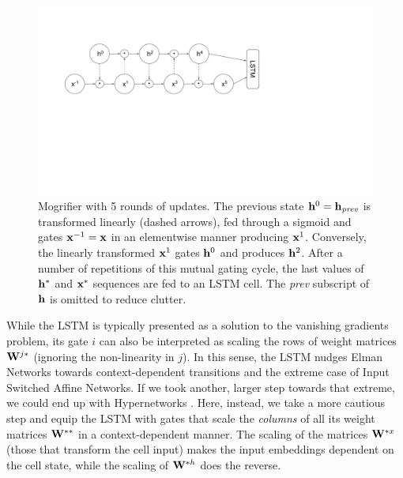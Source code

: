 \begin{figure}[!t]\centering
  \includegraphics[scale=0.7,trim={1.8cm 7.5cm 8.3cm 2.5cm},clip]
                  {mogrifier/figure/mogrifier.pdf}
  \caption[Mogrifier with 5 rounds of updates.]{Mogrifier with
    5 rounds of updates. The previous state $\mathbf{h}^0=\mathbf{h}_{\textit{prev}}$ is
    transformed linearly (dashed arrows), fed through a sigmoid and
    gates $\mathbf{x}^{-1}=\mathbf{x}$ in an elementwise manner producing $\mathbf{x}^1$.
    Conversely, the linearly transformed $\mathbf{x}^1$ gates $\mathbf{h}^0$ and
    produces $\mathbf{h}^2$. After a number of repetitions of this mutual
    gating cycle, the last values of $\mathbf{h}^*$ and $\mathbf{x}^*$ sequences are
    fed to an LSTM cell. The \emph{prev} subscript of $\mathbf{h}$ is omitted
    to reduce clutter.}
  \label{fig:mogrifier}
\end{figure}
%
While the LSTM is typically presented as a solution to the vanishing
gradients problem, its gate $i$ can also be interpreted as scaling the
rows of weight matrices $\mathbf{W}^{j*}$ (ignoring the non-linearity in
$j$).
%
In this sense, the LSTM nudges Elman Networks towards
context-dependent transitions and the extreme case of Input Switched
Affine Networks.
%
If we took another, larger step towards that extreme, we could end up
with Hypernetworks \citep{ha2016hypernetworks}.
%
Here, instead, we take a more cautious step and equip the LSTM with
gates that scale the \emph{columns} of all its weight matrices
$\mathbf{W}^{**}$ in a context-dependent manner.
%
The scaling of the matrices $\mathbf{W}^{*x}$ (those that transform the cell
input) makes the input embeddings dependent on the cell state, while
the scaling of $\mathbf{W}^{*h}$ does the reverse.

